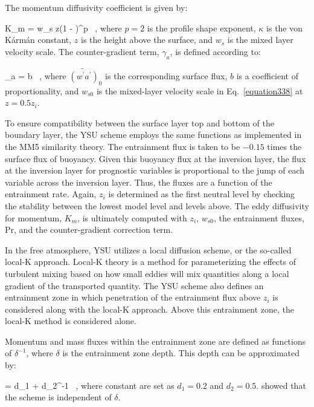 The momentum diffusivity coefficient is given by:

\bea
K_m = \kappa w_s z\left(1 - \right)^p \, , \label{equation338}
\eea
\noindent
 where $p = 2$ is the profile shape exponent, $\kappa$ is the von K\'{a}rm\'{a}n constant, $z$ is the height above the surface, and $w_s$ is the mixed layer velocity scale. The counter-gradient term, $\gamma_a$, is defined according to:

\be
\gamma_a = b \, , \label{equation339}
\ee
\noindent
 where $\widetilde{(w^{\prime}a^{\prime})}_0$ is the corresponding surface flux, $b$ is a coefficient of proportionality, and $w_{s0}$ is the mixed-layer velocity scale in Eq.~\eqref{equation338} at $z=0.5z_i$.

To ensure compatibility between the surface layer top and bottom of the boundary layer, the YSU scheme employs the same  \citet{Dyer} functions as implemented in the MM5 similarity theory. The entrainment flux is taken to be $-0.15$ times the surface flux of buoyancy. Given this buoyancy flux at the inversion layer, the flux at the inversion layer for prognostic variables is proportional to the jump of each variable across the inversion layer. Thus, the fluxes are a function of the entrainment rate. Again, $z_i$ is determined as the first neutral level by checking the stability between the lowest model level and levels above. The eddy diffusivity for momentum, $K_m$, is ultimately computed with $z_i$, $w_{s0}$, the entrainment fluxes, $\mathrm{Pr}$, and the counter-gradient correction term.

In the free atmosphere, YSU utilizes a local diffusion scheme, or the so-called local-K approach. Local-K theory is a method for parameterizing the effects of turbulent mixing based on how small eddies will mix quantities along a local gradient of the transported quantity. The YSU scheme also defines an entrainment zone in which penetration of the entrainment flux above $z_i$ is considered along with the local-K approach. Above this entrainment zone, the local-K method is considered alone.

Momentum and mass fluxes within the entrainment zone are defined as functions of $\delta^{-1}$, where $\delta$ is the entrainment zone depth. This depth can be approximated by:

\be
{} = d_1 + d_2^{-1} \, , \label{equation340}
\ee
\noindent
where constant are set as $d_1=0.2$ and $d_2=0.5$.  \citet{Hong06} showed that the scheme is independent of $\delta$.


